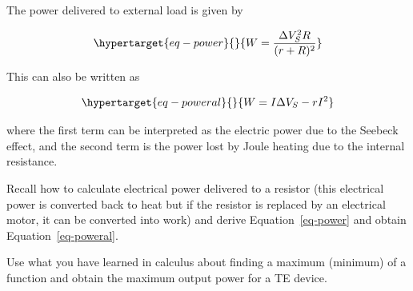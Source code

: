 \documentclass[
  letterpaper,
  DIV=11,
  numbers=noendperiod]{scrreprt}
\begin{document}
The power delivered to external load is given by

\begin{equation}\protect\hypertarget{eq-power}{}{W = \frac{{\Delta V_{S}^{2}}R}{(r + R)^{2}}}\label{eq-power}\end{equation}

This can also be written as

\begin{equation}\protect\hypertarget{eq-poweral}{}{W = I\Delta V_{S} - rI^{2}}\label{eq-poweral}\end{equation}

where the first term can be interpreted as the electric power due to the
Seebeck effect, and the second term is the power lost by Joule heating
due to the internal resistance.

\begin{tcolorbox}[enhanced jigsaw, toprule=.15mm, coltitle=black, bottomrule=.15mm, colbacktitle=quarto-callout-tip-color!10!white, opacitybacktitle=0.6, titlerule=0mm, colframe=quarto-callout-tip-color-frame, title=\textcolor{quarto-callout-tip-color}{\faLightbulb}\hspace{0.5em}{Question 4}, leftrule=.75mm, bottomtitle=1mm, breakable, opacityback=0, arc=.35mm, left=2mm, colback=white, rightrule=.15mm, toptitle=1mm]

Recall how to calculate electrical power delivered to a resistor (this
electrical power is converted back to heat but if the resistor is
replaced by an electrical motor, it can be converted into work) and
derive Equation~\ref{eq-power} and obtain Equation~\ref{eq-poweral}.

\end{tcolorbox}

\begin{tcolorbox}[enhanced jigsaw, toprule=.15mm, coltitle=black, bottomrule=.15mm, colbacktitle=quarto-callout-tip-color!10!white, opacitybacktitle=0.6, titlerule=0mm, colframe=quarto-callout-tip-color-frame, title=\textcolor{quarto-callout-tip-color}{\faLightbulb}\hspace{0.5em}{Question 5}, leftrule=.75mm, bottomtitle=1mm, breakable, opacityback=0, arc=.35mm, left=2mm, colback=white, rightrule=.15mm, toptitle=1mm]

Use what you have learned in calculus about finding a maximum (minimum)
of a function and obtain the maximum output power for a TE device.

\end{tcolorbox}
\end{document}
